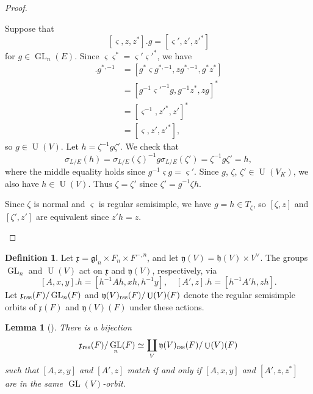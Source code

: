 \documentclass[11pt, reqno]{amsart}
\numberwithin{equation}{subsection}
\theoremstyle{plain}
\newtheorem{lem}[proposition]{Lemma}
\theoremstyle{definition}
\newtheorem{definition}[proposition]{Definition}
\newcommand{\gl}{\mathfrak{gl}}
\newcommand{\fx}{\mathfrak x}
\newcommand{\fy}{\mathfrak y}
\DeclareMathOperator{\GL}{GL}
\DeclareMathOperator{\U}{U}
\newcommand{\rss}{\textnormal{rss}}
\begin{document}
\begin{proof}
\begin{enumerate}[(1)]
Suppose that 
\[
    [\varsigma, z, z^\ast].g = [\varsigma', z', z'^\ast]
\]
for $g \in \GL_n(E)$. Since $\varsigma\varsigma^\ast
= \varsigma'\varsigma'^\ast$, we have
\begin{align*}
    [\varsigma, z, z^\ast].g^{\ast, -1} 
    &= [g^\ast \varsigma g^{\ast,-1}, zg^{\ast, -1}, g^\ast z^\ast] \\
    &= [g^{-1}\varsigma'^{-1} g, g^{-1} z^\ast, zg]^\ast\\ 
    &= [\varsigma^{-1}, z'^\ast, z']^\ast\\
    &= [\varsigma, z', z'^\ast],
\end{align*}
so $g \in \U(V)$.
Let $h = \zeta^{-1} g \zeta'$. 
We check that  
\[
    \sigma_{L/E}(h) = \sigma_{L/E}(\zeta)^{-1} g \sigma_{L/E}(\zeta')
    = \zeta^{-1} g \zeta' = h,
\]
where the middle equality holds since 
$g^{-1}\varsigma g = \varsigma'$.
Since $g$, $\zeta$, $\zeta' \in \U(V_K)$, we also have
$h \in \U(V)$.
Thus $\zeta = \zeta'$ since $\zeta' = g^{-1}\zeta h$.

Since $\zeta$ is normal and $\varsigma$ is regular
semisimple, we have $g = h \in T_\zeta$, so $[\zeta, z]$
and $[\zeta', z']$ are equivalent since $z' h = z$. 
\qedhere
\end{enumerate}
\end{proof}

\begin{definition}
\label{def:lieorbits}
Let $\fx = \gl_n \times F_n \times F^{-,n}$,
and let $\fy(V) = \mathfrak h(V) \times V^\vee$.
The groups $\GL_n$ and $\U(V)$ act on $\fx$ and
$\fy(V)$, respectively, via
\[
    [A, x, y].h = [h^{-1} A h, xh, h^{-1}y],\quad
    [A', z].h = [h^{-1}A' h, zh].
\]
Let $\fx_\rss(F)/\GL_n(F)$ and $\fy(V)_\rss(F)/\U(V)(F)$
denote the regular semisimple orbits of $\fx(F)$
and $\fy(V)(F)$ under these actions.
\end{definition}



\begin{lem}[{\cite[Lemma~3.1]{WeiGGP14}}]
\label{lem:liematch}
There is a bijection
\[
    \fx_\rss(F)/\GL_n(F) \simeq \coprod_{V}
    \fy(V)_\rss(F)/\U(V)(F)
\]
such that $[A, x, y]$ and $[A', z]$ match
if and only if $[A, x, y]$ and $[A', z, z^\ast]$
are in the same $\GL(V)$-orbit.
\end{lem}
\end{document}

